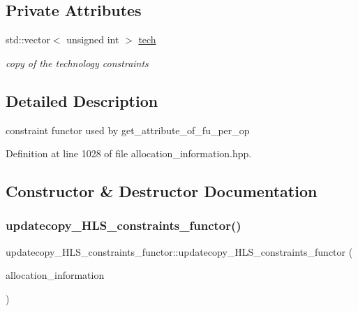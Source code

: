 \subsection*{Private Attributes}
\begin{DoxyCompactItemize}
\item 
std\+::vector$<$ unsigned int $>$ \hyperlink{structupdatecopy__HLS__constraints__functor_a220fee7790fcb46f07aed9f914765954}{tech}
\begin{DoxyCompactList}\small\item\em copy of the technology constraints \end{DoxyCompactList}\end{DoxyCompactItemize}


\subsection{Detailed Description}
constraint functor used by get\+\_\+attribute\+\_\+of\+\_\+fu\+\_\+per\+\_\+op 

Definition at line 1028 of file allocation\+\_\+information.\+hpp.



\subsection{Constructor \& Destructor Documentation}
\mbox{\label{structupdatecopy__HLS__constraints__functor_af834a00a3cbfe83e71a128ba425f0a93}} 
\subsubsection{\texorpdfstring{updatecopy\+\_\+\+H\+L\+S\+\_\+constraints\+\_\+functor()}{updatecopy\_HLS\_constraints\_functor()}}
{\footnotesize\ttfamily updatecopy\+\_\+\+H\+L\+S\+\_\+constraints\+\_\+functor\+::updatecopy\+\_\+\+H\+L\+S\+\_\+constraints\+\_\+functor (\begin{DoxyParamCaption}\item[{const \hyperlink{allocation__information_8hpp_ad90a86da153cba50cbcefc4679036755}{Allocation\+Information\+Ref}}]{allocation\+\_\+information }\end{DoxyParamCaption})\hspace{0.3cm}{\ttfamily [explicit]}}



